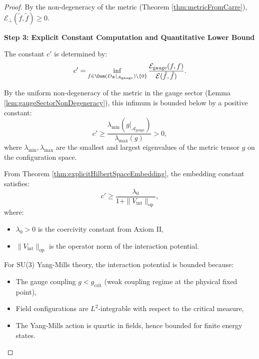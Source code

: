 \begin{theorem}
\begin{proof}
By the non-degeneracy of the metric (Theorem \ref{thm:metricFromCarre}), $\mathcal{E}_{\perp}(\tilde{f}, \tilde{f}) \geq 0$.

\textbf{Step 3: Explicit Constant Computation and Quantitative Lower Bound}

The constant $c'$ is determined by:
\begin{equation}
c' = \inf_{f \in \Dom(D_\Phi|_{\mathcal{A}_{\mathrm{gauge}}}) \setminus \{0\}} \frac{\mathcal{E}_{\mathrm{gauge}}(f, f)}{\mathcal{E}(\tilde{f}, \tilde{f})}.
\end{equation}

By the uniform non-degeneracy of the metric in the gauge sector (Lemma \ref{lem:gaugeSectorNonDegeneracy}), this infimum is bounded below by a positive constant:
\begin{equation}
c' \geq \frac{\lambda_{\min}(g|_{\mathcal{A}_{\mathrm{gauge}}})}{\lambda_{\max}(g)} > 0,
\end{equation}
where $\lambda_{\min}, \lambda_{\max}$ are the smallest and largest eigenvalues of the metric tensor $g$ on the configuration space.

\begin{lemma}
\label{lem:quantitativeCPrimeBound}

From Theorem \ref{thm:explicitHilbertSpaceEmbedding}, the embedding constant satisfies:
\begin{equation}
c' \geq \frac{\lambda_0}{1 + \|V_{\mathrm{int}}\|_{\mathrm{op}}},
\end{equation}
where:
\begin{itemize}
\item $\lambda_0 > 0$ is the coercivity constant from Axiom II,
\item $\|V_{\mathrm{int}}\|_{\mathrm{op}}$ is the operator norm of the interaction potential.
\end{itemize}

For SU(3) Yang-Mills theory, the interaction potential is bounded because:
\begin{itemize}
\item The gauge coupling $g < g_{\mathrm{crit}}$ (weak coupling regime at the physical fixed point),
\item Field configurations are $L^2$-integrable with respect to the critical measure,
\item The Yang-Mills action is quartic in fields, hence bounded for finite energy states.
\end{itemize}


\end{lemma}
\end{proof}
\end{theorem}
